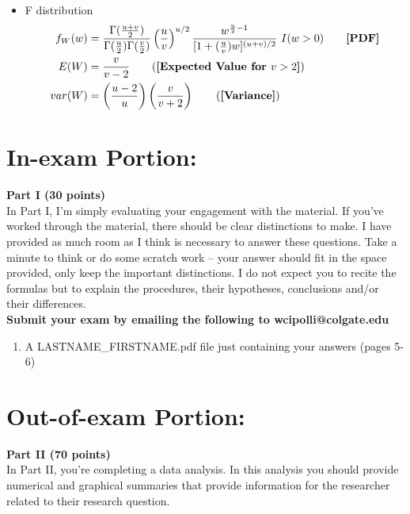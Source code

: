 \documentclass{article}
\begin{document}
\begin{multicols}{2}
\begin{itemize}
\begin{align*}
  \end{align*}
  \item F distribution
  \begin{align*}
    f_W(w)&=\frac{\Gamma(\frac{u+v}{2})}{\Gamma(\frac{u}{2})\Gamma(\frac{v}{2})}
\left(\frac{u}{v}\right)^{u/2}\frac{w^{\frac{u}{2}-1}}{[1+(\frac{u}{v})w]^{(u+v)/2}}~I(w>0) \tag*{\textbf{[PDF]}}\\
    E(W)&=\frac{v}{v-2} \tag{\textbf{[Expected Value for $v>2$]}}\\
    var(W)&=\left(\frac{u-2}{u}\right) \left(\frac{v}{v+2}\right) \tag{\textbf{[Variance]}}\\
  \end{align*}
  \end{itemize}
  \end{multicols}
\newpage

\section{In-exam Portion:}
\noindent \textbf{Part I (30 points)}\\
In Part I, I'm simply evaluating your engagement with the material. If you've worked
through the material, there should be clear distinctions to make. I have provided
as much room as I think is necessary to answer these questions. Take a minute to think
or do some scratch work -- your answer should fit in the space provided, only keep 
the important distinctions. I do not expect you to recite the formulas but to explain 
the procedures, their hypotheses, conclusions and/or their differences.\\

\noindent \textbf{Submit your exam by emailing the following to wcipolli@colgate.edu}
\begin{enumerate}
  \item A LASTNAME\_FIRSTNAME.pdf file just containing your answers (pages 5-6)
\end{enumerate}

\section{Out-of-exam Portion:}
\noindent \textbf{Part II (70 points)}\\
In Part II, you're completing a data analysis. In this analysis you should provide 
numerical and graphical summaries that provide information for the researcher
related to their research question. \\
\end{document}
